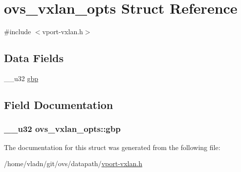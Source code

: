 \hypertarget{structovs__vxlan__opts}{}\section{ovs\+\_\+vxlan\+\_\+opts Struct Reference}
\label{structovs__vxlan__opts}


{\ttfamily \#include $<$vport-\/vxlan.\+h$>$}

\subsection*{Data Fields}
\begin{DoxyCompactItemize}
\item 
\+\_\+\+\_\+u32 \hyperlink{structovs__vxlan__opts_a9b035f7870829fa9116ca074ef1ac2b4}{gbp}
\end{DoxyCompactItemize}


\subsection{Field Documentation}
\hypertarget{structovs__vxlan__opts_a9b035f7870829fa9116ca074ef1ac2b4}{}
\subsubsection[{gbp}]{\setlength{\rightskip}{0pt plus 5cm}\+\_\+\+\_\+u32 ovs\+\_\+vxlan\+\_\+opts\+::gbp}\label{structovs__vxlan__opts_a9b035f7870829fa9116ca074ef1ac2b4}


The documentation for this struct was generated from the following file\+:\begin{DoxyCompactItemize}
\item 
/home/vladn/git/ovs/datapath/\hyperlink{vport-vxlan_8h}{vport-\/vxlan.\+h}\end{DoxyCompactItemize}
